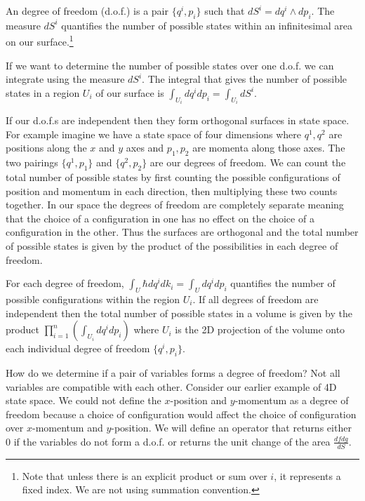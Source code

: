 \documentclass{article}
\begin{document}
\begin{defn}
	An degree of freedom (d.o.f.) is a pair $\{q^i,p_i \}$ such that $dS^i = dq^i \land dp_i$. The measure $dS^i$ quantifies the number of possible states within an infinitesimal area on our surface.\footnote{Note that unless there is an explicit product or sum over $i$, it represents a fixed index. We are not using summation convention.}
\end{defn}

	If we want to determine the number of possible states over one d.o.f. we can integrate using the measure $dS^i$. The integral that gives the number of possible states in a region $U_i$ of our surface is $\int_{U_i} dq^i dp_i = \int_{U_i} dS^i$.

	If our d.o.f.s are independent then they form orthogonal surfaces in state space. For example imagine we have a state space of four dimensions where $q^1,q^2$ are positions along the $x$ and $y$ axes and $p_1,p_2$ are momenta along those axes. The two pairings $\{q^1,p_1 \}$ and $\{q^2,p_2 \}$ are our degrees of freedom. We can count the total number of possible states by first counting the possible configurations of position and momentum in each direction, then multiplying these two counts together. In our space the degrees of freedom are completely separate meaning that the choice of a configuration in one has no effect on the choice of a configuration in the other. Thus the surfaces are orthogonal and the total number of possible states is given by the product of the possibilities in each degree of freedom.

\begin{prop}
	For each degree of freedom, $\int_U \hbar dq^i dk_i = \int_U dq^i dp_i$ quantifies the number of possible configurations within the region $U_i$. If all degrees of freedom are independent then the total number of possible states in a volume is given by the product ${\displaystyle \prod_{i=1}^{n}} (\int_{U_i} dq^i dp_i)$ where $U_i$ is the 2D projection of the volume onto each individual degree of freedom $\{q^i,p_i\}$.
\end{prop}

	How do we determine if a pair of variables forms a degree of freedom? Not all variables are compatible with each other. Consider our earlier example of 4D state space. We could not define the $x$-position and $y$-momentum as a degree of freedom because a choice of configuration would affect the choice of configuration over $x$-momentum and $y$-position. We will define an operator that returns either 0 if the variables do not form a d.o.f. or returns the unit change of the area $\frac{dfdg}{dS}$.
\end{document}
